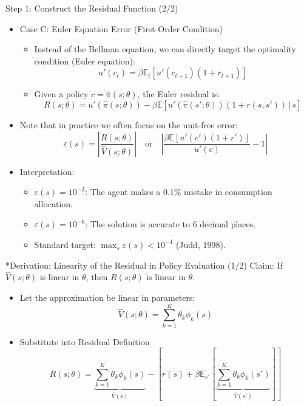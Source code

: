 \documentclass[aspectratio=169]{beamer}
\newcommand{\1}{\mathbf{1}}
\begin{document}
\begin{frame}{Step 1: Construct the Residual Function (2/2)}
    \small
        \begin{itemize}
            \item Case C: Euler Equation Error (First-Order Condition)
            \begin{itemize}
                \item Instead of the Bellman equation, we can directly target the optimality condition (Euler equation):
                $$ u'(c_t) = \beta \mathbb{E}_t \left[ u'(c_{t+1}) (1 + r_{t+1}) \right] $$
                \item Given a policy $c = \hat{\pi}(s; \theta)$, the Euler residual is:
                $$ R(s; \theta) = u'(\hat{\pi}(s; \theta)) - \beta \mathbb{E} \left[ u'(\hat{\pi}(s'; \theta)) (1 + r(s, s')) \,|\, s \right] $$
            \end{itemize}
        \item Note that in practice we often focus on the unit-free error:
        $$ \varepsilon(s) = \left| \frac{R(s; \theta)}{\hat{V}(s; \theta)} \right| \quad \text{or} \quad \left| \frac{\beta \mathbb{E} \left[ u'(c') (1 + r') \right]}{u'(c)} - 1 \right|$$ 
        \item Interpretation:
        \begin{itemize}
            \item $\varepsilon(s) = 10^{-3}$: The agent makes a 0.1\% mistake in consumption allocation.
            \item $\varepsilon(s) = 10^{-6}$: The solution is accurate to 6 decimal places.
            \item Standard target: $\max_s \varepsilon(s) < 10^{-4}$ (Judd, 1998).
        \end{itemize}
        \end{itemize}
    \end{frame}
    
\begin{frame}{*Derivation: Linearity of the Residual in Policy Evaluation (1/2)}
    Claim: If $\hat{V}(s; \theta)$ is linear in $\theta$, then $R(s; \theta)$ is linear in $\theta$.
\begin{itemize}
    \item Let the approximation be linear in parameters: 
    $$ \hat{V}(s; \theta) = \sum_{k=1}^K \theta_k \phi_k(s) $$
    
    \item Substitute into Residual Definition
    $$ R(s; \theta) = \underbrace{\sum_{k=1}^K \theta_k \phi_k(s)}_{\hat{V}(s)} - \left[ r(s) + \beta \mathbb{E}_{s'} \left[ \underbrace{\sum_{k=1}^K \theta_k \phi_k(s')}_{\hat{V}(s')} \right] \right] $$
\end{itemize}
\end{frame}
\end{document}
